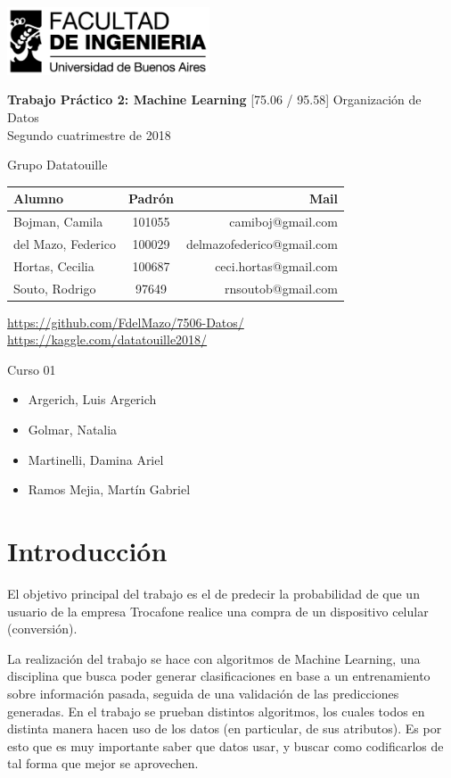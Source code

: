 \documentclass[a4paper]{article}
\makeatletter
\newcommand{\materia}{[75.06 / 95.58] Organización de Datos}
\newcommand{\trabajo}{Trabajo Práctico 2: Machine Learning}
\newcommand{\cuatrimestre}{Segundo cuatrimestre de 2018}
\newcommand{\grupo}{Grupo Datatouille}
\newcommand{\repo}{https://github.com/FdelMazo/7506-Datos/}
\newcommand{\kernel}{https://kaggle.com/datatouille2018/}
\newcommand{\alumnos}{
    Bojman, Camila & 101055 &  camiboj@gmail.com\\
    del Mazo, Federico & 100029 & delmazofederico@gmail.com\\
    Hortas, Cecilia & 100687 & ceci.hortas@gmail.com\\
    Souto, Rodrigo & 97649 & rnsoutob@gmail.com\\
}
\newcommand{\curso}{Curso 01}
\newcommand{\docentes}{
    \item Argerich, Luis Argerich
    \item Golmar, Natalia
    \item Martinelli, Damina Ariel
    \item Ramos Mejia, Martín Gabriel
}
\makeatother
\begin{document}

\begin{titlepage}
	\hfill\includegraphics[width=6cm]{fiuba.jpg}
    \begin{center}
    \vfill
    \Huge \textbf{\trabajo}
    \vskip2cm
    \Large \materia\\
    \cuatrimestre
    \vfill
    \begin{flushleft} 
    \grupo
    \end{flushleft}
    \begin{tabular}{|l|c|r|}
	\hline
	Alumno & Padrón & Mail\\
	\hline \hline
    \alumnos
	\hline
	\end{tabular}
    \begin{flushleft} 
    \large{\url{\repo}} \\
    \large{\url{\kernel}} \\
    \end{flushleft}
    \vskip1cm
    \end{center}
    \curso
    \begin{itemize}
        \docentes
    \end{itemize}
\end{titlepage}
\tableofcontents
\newpage
{}
\setcounter{page}{1}

\section{Introducción}

El objetivo principal del trabajo es el de predecir la probabilidad de que un usuario de la empresa Trocafone realice una compra de un dispositivo celular (conversión). 

La realización del trabajo se hace con algoritmos de Machine Learning, una disciplina que busca poder generar clasificaciones en base a un entrenamiento sobre información pasada, seguida de una validación de las predicciones generadas. En el trabajo se prueban distintos algoritmos, los cuales todos en distinta manera hacen uso de los datos (en particular, de sus atributos). Es por esto que es muy importante saber que datos usar, y buscar como codificarlos de tal forma que mejor se aprovechen.
\end{document}
